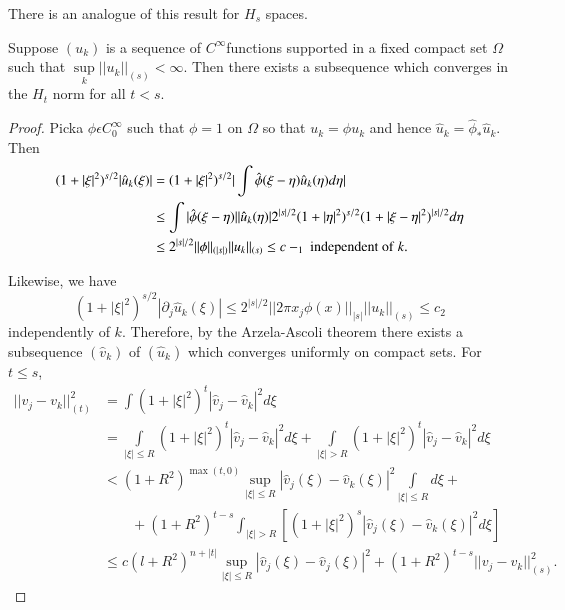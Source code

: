 There is an analogue of this result for $H_s$ spaces. 

\setcounter{lem}{16}
\begin{lem} \label{chap3:sec1:lem3.17}%
Suppose $(u_k)$ is a sequence of $C^\infty $functions supported
  in a fixed compact set $\Omega$ such that $\sup\limits_k|| u_k
  ||_{(s)}< \infty $. Then there exists a subsequence which
  converges in the $H_t$ norm for all $t < s$.
\end{lem}	

\begin{proof}
  Pick\pageoriginale a $\phi \epsilon C^\infty_0$ such that $\phi = 1$ on $\Omega$
  so that $u_k= \phi u_k$ and hence $\hat{u}_k =\hat{\phi}_*
  \hat{u}_k$. Then  
{\fontsize{10pt}{12pt}\selectfont
\begin{align*}
  (1+|\xi |^2)^{s/2} |\hat{u}_k (\xi)| &= (1+ |\xi |^2)^{s/2} | \int
  \hat{\phi}(\xi - \eta) \hat{u}_k(\eta) d \eta |\\ 
  & \leq \int |\hat{\phi}(\xi - \eta)|| \hat{u}_k (\eta) | 2^{|s|/2}
  (1+|\eta|^2)^{s/2}(1 + | \xi -\eta | ^2)^{ |s|/2} d \eta  \\ 
  & \leq  2^{|s|/2}|| \phi ||_{(|s|)}||u_k ||_{(s)} \leq c-_1 ~{\rm
    independent~ of ~} k.   
\end{align*}}\relax

Likewise, we have 
$$
(1+ |\xi|^2)^{s/2}|\partial_j \hat{u}_k (\xi)| \leq 2^{|s|/2} || 2 \pi
x_j \phi (x) ||_{|s|} || u_k || _{(s)} \leq c_2 
$$
independently of $k$. Therefore, by the Arzela-Ascoli theorem there
exists a subsequence $(\hat{v}_k)$ of $(\hat{u}_k)$ which converges
uniformly on compact sets. For $t \leq s$,  
\begin{align*}
  || v_j - v_k || ^2_{(t)} & = \int (1+|\xi |^2)^t |\hat{v}_j -
  \hat{v}_k |^2 d \xi\\ 
  & = \int\limits_{|\xi | \leq R} (1+|\xi |^2)^t
  |\hat{v}_j-\hat{v}_k|^2 d\xi + \int\limits_{|\xi | > R} (1+|\xi |^2)^t
  |\hat{v}_j-\hat{v}_k|^2 d\xi \\ 
  &  <  ( 1+R^2)^{\max (t, 0)} \sup_{|\xi| \leq R}
  |\hat{v}_j(\xi)-\hat{v}_k(\xi ) |^2 \int\limits_{|\xi|\leq R} d\xi +\\
  & \qquad +(1+R^2)^{t-s} \int_{|\xi | > R} [ (1+|\xi|^2 )^s | \hat{v}_j(\xi )-
    \hat{v}_k(\xi )|^2 d \xi ] \\ 
  & \leq c(l+R^2)^{n+|t|} \sup\limits_{|\xi |\leq R}| \hat{v}_j(\xi )-
  \hat{v}_j(\xi )|^2 + (1 + R^2)^{t-s} || v_j - v_k ||^{2}_{(s)}.  
\end{align*}
\end{proof}

